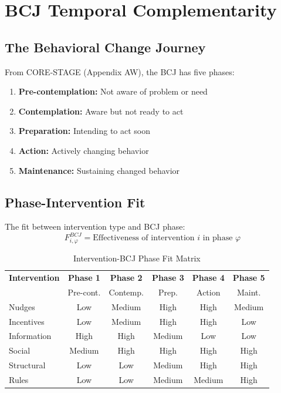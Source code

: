\section{BCJ Temporal Complementarity}
\label{sec:bcj}

\subsection{The Behavioral Change Journey}

From CORE-STAGE (Appendix AW), the BCJ has five phases:
\begin{enumerate}[noitemsep]
    \item \textbf{Pre-contemplation:} Not aware of problem or need
    \item \textbf{Contemplation:} Aware but not ready to act
    \item \textbf{Preparation:} Intending to act soon
    \item \textbf{Action:} Actively changing behavior
    \item \textbf{Maintenance:} Sustaining changed behavior
\end{enumerate}

\subsection{Phase-Intervention Fit}

\begin{definition}
The fit between intervention type and BCJ phase:
\begin{equation}
F^{BCJ}_{i,\varphi} = \text{Effectiveness of intervention } i \text{ in phase } \varphi
\end{equation}
\end{definition}

\begin{table}[h]
\centering
\caption{Intervention-BCJ Phase Fit Matrix}
\label{tab:bcj-fit}
\renewcommand{\arraystretch}{1.3}
\small
\begin{tabular}{@{}lccccc@{}}
\toprule
\textbf{Intervention} & \textbf{Phase 1} & \textbf{Phase 2} & \textbf{Phase 3} & \textbf{Phase 4} & \textbf{Phase 5} \\
 & Pre-cont. & Contemp. & Prep. & Action & Maint. \\
\midrule
Nudges & Low & Medium & High & High & Medium \\
Incentives & Low & Medium & High & High & Low \\
Information & High & High & Medium & Low & Low \\
Social & Medium & High & High & High & High \\
Structural & Low & Low & Medium & High & High \\
Rules & Low & Low & Medium & Medium & High \\
\bottomrule
\end{tabular}
\end{table}


